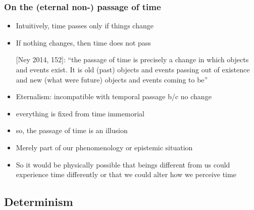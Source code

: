 \begin{frame}
\frametitle{On the (eternal non-) passage of time}

\begin{itemize}%

\item Intuitively, time passes only if things change
\item If nothing changes, then time does not pass


\item[] [Ney 2014, 152]: ``the passage of time is precisely a change in which objects and events exist. It is old (past) objects and events passing out of existence and new (what were future) objects and events coming to be'' 

\item Eternalism: incompatible with temporal passage b/c no change
\bi
\item everything is fixed from time immemorial
\item so, the passage of time is an illusion
\item Merely part of our phenomenology or epistemic situation
\ei
\item So it would be physically possible that beings different from us could experience time differently or that we could alter how we perceive time %


\end{itemize}
\end{frame}

\subsection{Determinism}


